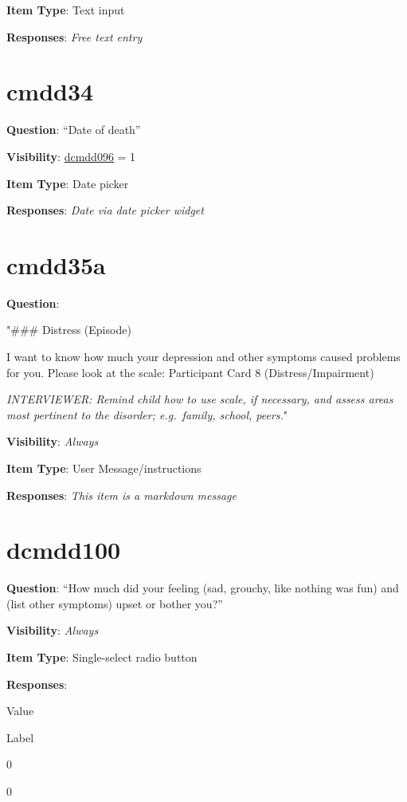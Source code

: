 \documentclass[
]{book}
\begin{document}
\textbf{Item Type}: Text input

\textbf{Responses}: \emph{Free text entry}

\hypertarget{cmdd34}{%
\section{cmdd34}\label{cmdd34}}

\textbf{Question}: ``Date of death''

\textbf{Visibility}: \protect\hyperlink{dcmdd096}{dcmdd096} = 1

\textbf{Item Type}: Date picker

\textbf{Responses}: \emph{Date via date picker widget}

\hypertarget{cmdd35a}{%
\section{cmdd35a}\label{cmdd35a}}

\textbf{Question}:

"\#\#\# Distress (Episode)

I want to know how much your depression and other symptoms caused problems for you. Please look at the scale: Participant Card 8 (Distress/Impairment)

\emph{INTERVIEWER: Remind child how to use scale, if necessary, and assess areas most pertinent to the disorder; e.g.~family, school, peers.}"

\textbf{Visibility}: \emph{Always}

\textbf{Item Type}: User Message/instructions

\textbf{Responses}: \emph{This item is a markdown message}

\hypertarget{dcmdd100}{%
\section{dcmdd100}\label{dcmdd100}}

\textbf{Question}: ``How much did your feeling (sad, grouchy, like nothing was fun) and (list other symptoms) upset or bother you?''

\textbf{Visibility}: \emph{Always}

\textbf{Item Type}: Single-select radio button

\textbf{Responses}:

Value

Label

0

0
\end{document}
